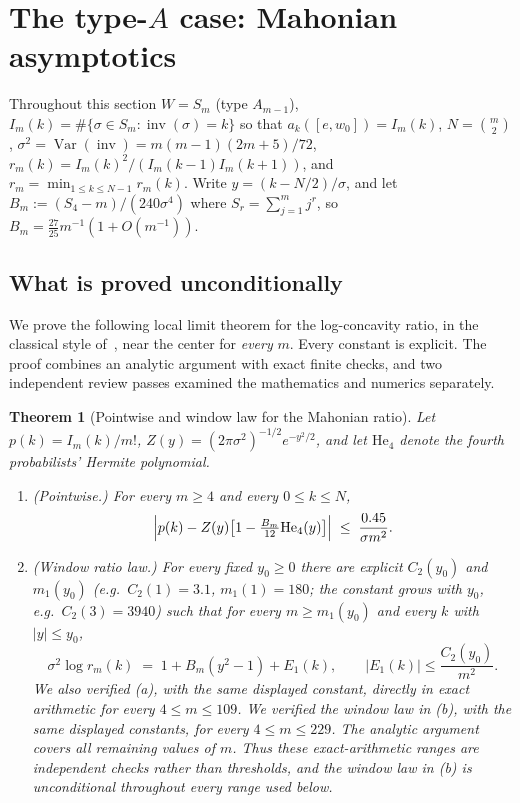 \documentclass[11pt]{amsart}
\theoremstyle{plain}
\newtheorem{theorem}{Theorem}[section]
\theoremstyle{definition}
\theoremstyle{remark}
\newcommand{\W}{W}
\DeclareMathOperator{\inv}{inv}
\DeclareMathOperator{\Var}{Var}
\begin{document}
\section{The type-\texorpdfstring{$A$}{A} case: Mahonian asymptotics}
\label{sec:F2}

Throughout this section $\W=S_m$ (type $A_{m-1}$), $I_m(k)=\#\{\sigma\in
S_m:\inv(\sigma)=k\}$ so that $a_k([e,w_0])=I_m(k)$, $N=\binom m2$,
$\sigma^2=\Var(\inv)=m(m-1)(2m+5)/72$, $r_m(k)=I_m(k)^2/(I_m(k-1)I_m(k+1))$,
and $r_m=\min_{1\le k\le N-1}r_m(k)$. Write $y=(k-N/2)/\sigma$, and let
$B_m:=(S_4-m)/(240\sigma^4)$ where $S_r=\sum_{j=1}^m j^r$, so $B_m=\tfrac{27}{25}m^{-1}(1+O(m^{-1}))$.

\subsection*{What is proved unconditionally}
We prove the following local limit theorem for the log-concavity ratio, in
the classical style of~\cite{petrov1975}, near the center for \emph{every}
$m$. Every constant is explicit. The proof combines an analytic argument
with exact finite checks, and two independent review passes examined the
mathematics and numerics separately.

\begin{theorem}[Pointwise and window law for the Mahonian ratio]
\label{thm:G1}
Let $p(k)=I_m(k)/m!$, $Z(y)=(2\pi\sigma^2)^{-1/2}e^{-y^2/2}$, and let
$\mathrm{He}_4$ denote the fourth probabilists' Hermite polynomial.
\begin{enumerate}[label=(\alph*)]
\item \textup{(Pointwise.)} For every $m\ge4$ and every $0\le k\le N$,
\[
\Bigl| p(k) - Z(y)\bigl[1-\tfrac{B_m}{12}\mathrm{He}_4(y)\bigr] \Bigr|
\;\le\; \frac{0.45}{\sigma m^2}.
\]
\item \textup{(Window ratio law.)} For every fixed $y_0\ge0$ there are
explicit $C_2(y_0)$ and $m_1(y_0)$ (e.g.\ $C_2(1)=3.1$, $m_1(1)=180$; the
constant grows with $y_0$, e.g.\ $C_2(3)=3940$) such that for every $m\ge
m_1(y_0)$ and every $k$ with $|y|\le y_0$,
\[
\sigma^2\log r_m(k) \;=\; 1+B_m(y^2-1)+E_1(k), \qquad |E_1(k)|\le
\frac{C_2(y_0)}{m^2}.
\]
We also verified (a), with the same displayed constant, directly in exact
arithmetic for every $4\le m\le109$. We verified the window law in (b),
with the same displayed constants, for every $4\le m\le229$. The analytic
argument covers all remaining values of $m$. Thus these exact-arithmetic
ranges are independent checks rather than thresholds, and the window law
in (b) is unconditional throughout every range used below.
\end{enumerate}
\end{theorem}
\end{document}
